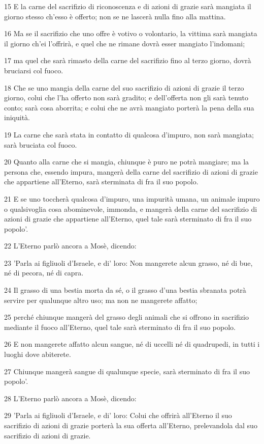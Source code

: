 \par 15 E la carne del sacrifizio di riconoscenza e di azioni di grazie sarà mangiata il giorno stesso ch'esso è offerto; non se ne lascerà nulla fino alla mattina.
\par 16 Ma se il sacrifizio che uno offre è votivo o volontario, la vittima sarà mangiata il giorno ch'ei l'offrirà, e quel che ne rimane dovrà esser mangiato l'indomani;
\par 17 ma quel che sarà rimasto della carne del sacrifizio fino al terzo giorno, dovrà bruciarsi col fuoco.
\par 18 Che se uno mangia della carne del suo sacrifizio di azioni di grazie il terzo giorno, colui che l'ha offerto non sarà gradito; e dell'offerta non gli sarà tenuto conto; sarà cosa aborrita; e colui che ne avrà mangiato porterà la pena della sua iniquità.
\par 19 La carne che sarà stata in contatto di qualcosa d'impuro, non sarà mangiata; sarà bruciata col fuoco.
\par 20 Quanto alla carne che si mangia, chiunque è puro ne potrà mangiare; ma la persona che, essendo impura, mangerà della carne del sacrifizio di azioni di grazie che appartiene all'Eterno, sarà sterminata di fra il suo popolo.
\par 21 E se uno toccherà qualcosa d'impuro, una impurità umana, un animale impuro o qualsivoglia cosa abominevole, immonda, e mangerà della carne del sacrifizio di azioni di grazie che appartiene all'Eterno, quel tale sarà sterminato di fra il suo popolo'.
\par 22 L'Eterno parlò ancora a Mosè, dicendo:
\par 23 'Parla ai figliuoli d'Israele, e di' loro: Non mangerete alcun grasso, né di bue, né di pecora, né di capra.
\par 24 Il grasso di una bestia morta da sé, o il grasso d'una bestia sbranata potrà servire per qualunque altro uso; ma non ne mangerete affatto;
\par 25 perché chiunque mangerà del grasso degli animali che si offrono in sacrifizio mediante il fuoco all'Eterno, quel tale sarà sterminato di fra il suo popolo.
\par 26 E non mangerete affatto alcun sangue, né di uccelli né di quadrupedi, in tutti i luoghi dove abiterete.
\par 27 Chiunque mangerà sangue di qualunque specie, sarà sterminato di fra il suo popolo'.
\par 28 L'Eterno parlò ancora a Mosè, dicendo:
\par 29 'Parla ai figliuoli d'Israele, e di' loro: Colui che offrirà all'Eterno il suo sacrifizio di azioni di grazie porterà la sua offerta all'Eterno, prelevandola dal suo sacrifizio di azioni di grazie.
